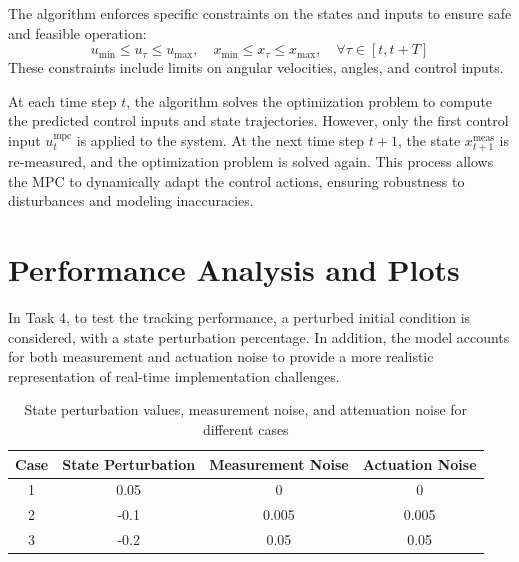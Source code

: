 The algorithm enforces specific constraints on the states and inputs to ensure safe and feasible operation:
\begin{equation}
u_{\text{min}} \leq u_\tau \leq u_{\text{max}}, \quad x_{\text{min}} \leq x_\tau \leq x_{\text{max}}, \quad \forall \tau \in [t, t+T]
\end{equation}
These constraints include limits on angular velocities, angles, and control inputs.

At each time step $t$, the algorithm solves the optimization problem to compute the predicted control inputs and state trajectories. However, only the first control input $u_t^{\text{mpc}}$ is applied to the system. At the next time step $t+1$, the state $x_{t+1}^{\text{meas}}$ is re-measured, and the optimization problem is solved again. This process allows the MPC to dynamically adapt the control actions, ensuring robustness to disturbances and modeling inaccuracies.



\section{Performance Analysis and Plots}
In Task 4, to test the tracking performance, a perturbed initial condition is considered, with a state perturbation percentage. In addition, the model accounts for both measurement and actuation noise to provide a more realistic representation of real-time implementation challenges.
\begin{table}[h!]
\centering
\begin{tabular}{|c|c|c|c|}
\hline
\textbf{Case} & \textbf{State Perturbation} & \textbf{Measurement Noise} & \textbf{Actuation Noise} \\ \hline
1        & 0.05                                   & 0                          & 0                          \\ \hline
2        & -0.1                                   & 0.005                      & 0.005                      \\ \hline
3        & -0.2                                   & 0.05                       & 0.05                       \\ \hline
\end{tabular}
\caption{State perturbation values, measurement noise, and attenuation noise for different cases}
\label{tab:perturbation_cases}
\end{table}

